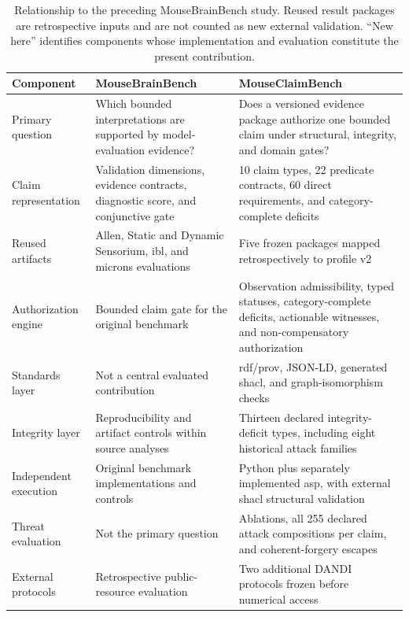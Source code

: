 \begin{table}[!htbp]
\centering
\caption{Relationship to the preceding MouseBrainBench study. Reused result packages are retrospective inputs and are not counted as new external validation. ``New here'' identifies components whose implementation and evaluation constitute the present contribution.}
\label{tab:mousebrainbench-relationship}
\scriptsize
\renewcommand{\arraystretch}{1.00}
\begin{tabularx}{\textwidth}{@{}P{0.21\textwidth}P{0.35\textwidth}Y@{}}
\toprule
Component & MouseBrainBench & MouseClaimBench \\
\midrule
Primary question & Which bounded interpretations are supported by model-evaluation evidence? & Does a versioned evidence package authorize one bounded claim under structural, integrity, and domain gates? \\
Claim representation & Validation dimensions, evidence contracts, diagnostic score, and conjunctive gate & 10 claim types, 22 predicate contracts, 60 direct requirements, and category-complete deficits \\
Reused artifacts & Allen, Static and Dynamic Sensorium, \ac{ibl}, and \ac{microns} evaluations & Five frozen packages mapped retrospectively to profile v2 \\
Authorization engine & Bounded claim gate for the original benchmark & Observation admissibility, typed statuses, category-complete deficits, actionable witnesses, and non-compensatory authorization \\
Standards layer & Not a central evaluated contribution & \ac{rdf}/\ac{prov}, JSON-LD, generated \ac{shacl}, and graph-isomorphism checks \\
Integrity layer & Reproducibility and artifact controls within source analyses & Thirteen declared integrity-deficit types, including eight historical attack families \\
Independent execution & Original benchmark implementations and controls & Python plus separately implemented \ac{asp}, with external \ac{shacl} structural validation \\
Threat evaluation & Not the primary question & Ablations, all 255 declared attack compositions per claim, and coherent-forgery escapes \\
External protocols & Retrospective public-resource evaluation & Two additional DANDI protocols frozen before numerical access \\
\bottomrule
\end{tabularx}
\end{table}
